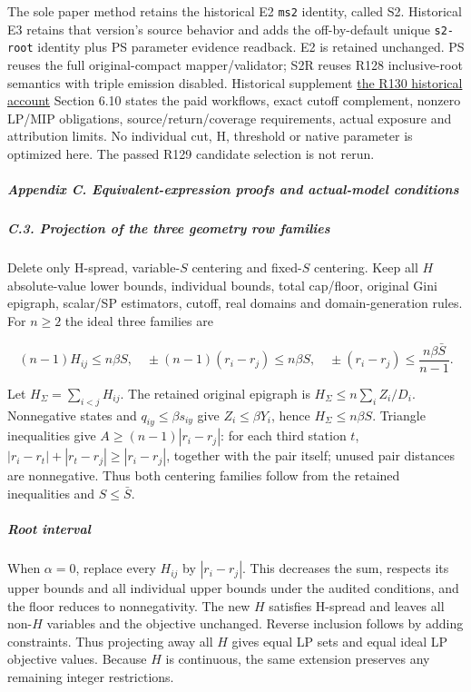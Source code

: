 \documentclass[
  american,
  11pt,
]{article}
\begin{document}
The sole paper method retains the historical E2
\texttt{ms2} identity, called S2. Historical E3 retains
that version's source behavior and adds the off-by-default unique
\texttt{s2-\allowbreak{}root} identity plus PS parameter evidence
readback. E2 is retained unchanged. PS reuses the full original-compact
mapper/validator; S2R reuses R128 inclusive-root semantics with triple
emission disabled. Historical supplement
\href{https://github.com/yifanXovo/TailoredExact/blob/39043b15b3cceae2cab14a3fbaec39e2b16339ce/results/unified_exact_round130/manuscript.md}{the
R130 historical account} Section 6.10 states the paid workflows, exact
cutoff complement, nonzero LP/MIP obligations, source/return/coverage
requirements, actual exposure and attribution limits. No individual cut,
H, threshold or native parameter is optimized here. The passed R129
candidate selection is not rerun.

\clearpage

\subparagraph{Appendix C. Equivalent-expression proofs and actual-model
conditions}\label{appendix-c.-equivalent-expression-proofs-and-actual-model-conditions}

\subparagraph{C.3. Projection of the three geometry row
families}\label{c.3.-projection-of-the-three-geometry-row-families}

Delete only H-spread, variable-\(S\) centering and fixed-\(S\)
centering. Keep all \(H\) absolute-value lower bounds, individual
bounds, total cap/floor, original Gini epigraph, scalar/SP estimators,
cutoff, real domains and domain-generation rules. For \(n\ge2\) the
ideal three families are

\[
(n-1)H_{ij}\le n\beta S,\quad
\pm(n-1)(r_i-r_j)\le n\beta S,\quad
\pm(r_i-r_j)\le \frac{n\beta\bar S}{n-1}.
\]

Let \(H_\Sigma=\sum_{i<j}H_{ij}\). The retained original epigraph is
\(H_\Sigma\le n\sum_i Z_i/D_i\). Nonnegative states and
\(q_{iy}\le\beta s_{iy}\) give \(Z_i\le\beta Y_i\), hence
\(H_\Sigma\le n\beta S\). Triangle inequalities give
\(A\ge(n-1)|r_i-r_j|\): for each third station \(t\),
\(|r_i-r_t|+|r_t-r_j|\ge|r_i-r_j|\), together with the pair itself;
unused pair distances are nonnegative. Thus both centering families
follow from the retained inequalities and \(S\le\bar S\).

\subparagraph{Root interval}\label{root-interval}

When \(\alpha=0\), replace every \(H_{ij}\) by \(|r_i-r_j|\). This
decreases the sum, respects its upper bounds and all individual upper
bounds under the audited conditions, and the floor reduces to
nonnegativity. The new \(H\) satisfies H-spread and leaves all non-\(H\)
variables and the objective unchanged. Reverse inclusion follows by
adding constraints. Thus projecting away all \(H\) gives equal LP sets
and equal ideal LP objective values. Because \(H\) is continuous, the
same extension preserves any remaining integer restrictions.
\end{document}
